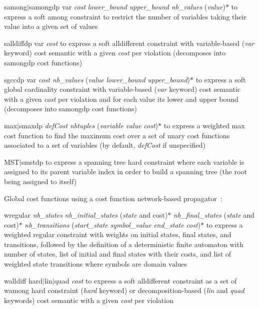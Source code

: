 \documentclass{article}
\begin{document}
\begin{DoxyItemize}
\begin{DoxyItemize}
\item samong$\vert$samongdp var {\itshape cost} {\itshape lower\-\_\-bound} {\itshape upper\-\_\-bound} {\itshape nb\-\_\-values} ({\itshape value})$\ast$ to express a soft among constraint to restrict the number of variables taking their value into a given set of values
\item salldiffdp var {\itshape cost} to express a soft alldifferent constraint with variable-\/based ({\itshape var} keyword) cost semantic with a given {\itshape cost} per violation (decomposes into samongdp cost functions)
\item sgccdp var {\itshape cost} {\itshape nb\-\_\-values} ({\itshape value} {\itshape lower\-\_\-bound} {\itshape upper\-\_\-bound})$\ast$ to express a soft global cardinality constraint with variable-\/based ({\itshape var} keyword) cost semantic with a given {\itshape cost} per violation and for each value its lower and upper bound (decomposes into samongdp cost functions)
\item max$\vert$smaxdp {\itshape def\-Cost} {\itshape nbtuples} ({\itshape variable} {\itshape value} {\itshape cost})$\ast$ to express a weighted max cost function to find the maximum cost over a set of unary cost functions associated to a set of variables (by default, {\itshape def\-Cost} if unspecified)
\item M\-S\-T$\vert$smstdp to express a spanning tree hard constraint where each variable is assigned to its parent variable index in order to build a spanning tree (the root being assigned to itself)
\end{DoxyItemize}
\item Global cost functions using a cost function network-\/based propagator\-~\cite{Ficolofo2012}:
\begin{DoxyItemize}
\item wregular {\itshape nb\-\_\-states} {\itshape nb\-\_\-initial\-\_\-states} ({\itshape state} and cost)$\ast$ {\itshape nb\-\_\-final\-\_\-states} ({\itshape state} and cost)$\ast$ {\itshape nb\-\_\-transitions} ({\itshape start\-\_\-state} {\itshape symbol\-\_\-value} {\itshape end\-\_\-state} {\itshape cost})$\ast$ to express a weighted regular constraint with weights on initial states, final states, and transitions, followed by the definition of a deterministic finite automaton with number of states, list of initial and final states with their costs, and list of weighted state transitions where symbols are domain values
\item walldiff hard$\vert$lin$\vert$quad {\itshape cost} to express a soft alldifferent constraint as a set of wamong hard constraint ({\itshape hard} keyword) or decomposition-\/based ({\itshape lin} and {\itshape quad} keywords) cost semantic with a given {\itshape cost} per violation

\end{DoxyItemize}
\end{DoxyItemize}
\end{document}
